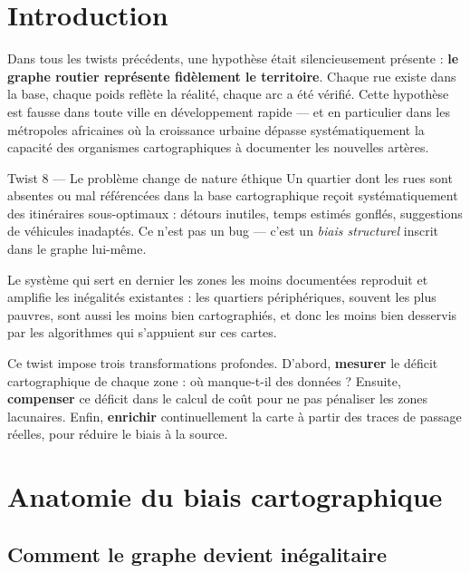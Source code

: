 \documentclass[12pt,a4paper]{article}
\theoremstyle{definition}
\theoremstyle{remark}
\begin{document}
\section*{Introduction}

Dans tous les twists précédents, une hypothèse était silencieusement
présente : \textbf{le graphe routier représente fidèlement le territoire}.
Chaque rue existe dans la base, chaque poids reflète la réalité,
chaque arc a été vérifié. Cette hypothèse est fausse dans toute
ville en développement rapide --- et en particulier dans les
métropoles africaines où la croissance urbaine dépasse systématiquement
la capacité des organismes cartographiques à documenter les
nouvelles artères.

\begin{twistbox}{Twist 8 --- Le problème change de nature éthique}
Un quartier dont les rues sont absentes ou mal référencées dans
la base cartographique reçoit systématiquement des itinéraires
sous-optimaux : détours inutiles, temps estimés gonflés, suggestions
de véhicules inadaptés. Ce n'est pas un bug --- c'est un \emph{biais
structurel} inscrit dans le graphe lui-même.

Le système qui sert en dernier les zones les moins documentées
reproduit et amplifie les inégalités existantes : les quartiers
périphériques, souvent les plus pauvres, sont aussi les moins bien
cartographiés, et donc les moins bien desservis par les algorithmes
qui s'appuient sur ces cartes.
\end{twistbox}

Ce twist impose trois transformations profondes. D'abord, \textbf{mesurer}
le déficit cartographique de chaque zone : où manque-t-il des données ?
Ensuite, \textbf{compenser} ce déficit dans le calcul de coût pour ne
pas pénaliser les zones lacunaires. Enfin, \textbf{enrichir} continuellement
la carte à partir des traces de passage réelles, pour réduire le biais
à la source.

\newpage

\section{Anatomie du biais cartographique}

\subsection{Comment le graphe devient inégalitaire}
\end{document}
